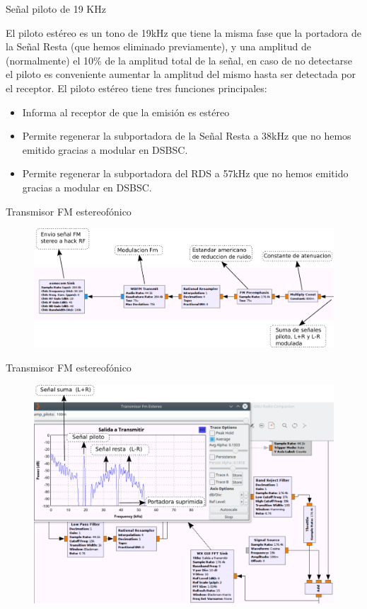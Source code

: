\begin{frame}{Señal piloto de 19 KHz}

 El piloto estéreo es un tono de 19kHz que tiene la misma fase que la portadora de la Señal Resta (que hemos eliminado previamente), y una amplitud de (normalmente) el 10\% de la amplitud total de la señal, en caso de no detectarse el piloto es conveniente aumentar la amplitud del mismo hasta ser detectada por el receptor.
El piloto estéreo tiene tres funciones principales:

\begin{itemize}
    \item {Informa al receptor de que la emisión es estéreo}
    \item{Permite regenerar la subportadora de la Señal Resta a 38kHz que no hemos emitido gracias a modular en DSBSC.}
    \item{Permite regenerar la subportadora del RDS a 57kHz que no hemos emitido gracias a modular en DSBSC.}
\end{itemize}
    
\end{frame}

\begin{frame}{Transmisor FM estereofónico}

\begin{figure}[H]
\centering
\vspace{-3mm}
\includegraphics[width=\textwidth]{parte3/lab12/pdf/lab12_4.pdf}
\end{figure}
    
\end{frame}

\begin{frame}{Transmisor FM estereofónico}

\begin{figure}[H]
\centering
\vspace{-3mm}
\includegraphics[width=.9\textwidth]{parte3/lab12/pdf/lab12_5.pdf}
\end{figure}
    
\end{frame}
